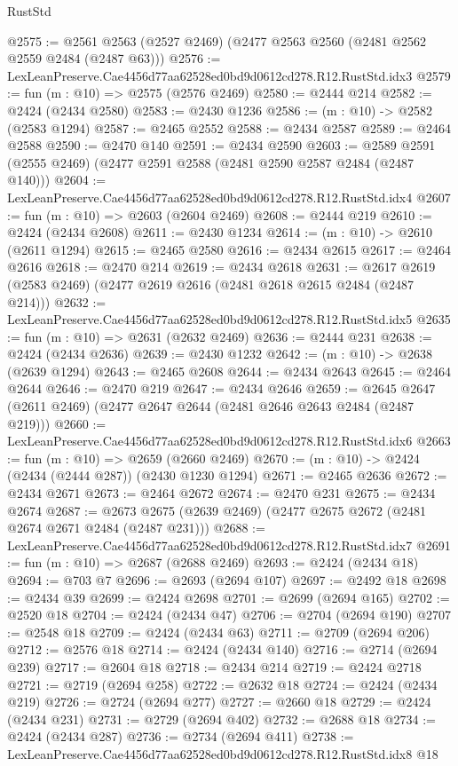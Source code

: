 \begin{lexlean}{RustStd}
\begin{coremodule}
@2575 := @2561 @2563 (@2527 @2469) (@2477 @2563 @2560 (@2481 @2562 @2559 @2484 (@2487 @63)))
@2576 := LexLeanPreserve.Cae4456d77aa62528ed0bd9d0612cd278.R12.RustStd.idx3
@2579 := fun (m : @10) => @2575 (@2576 @2469)
@2580 := @2444 @214
@2582 := @2424 (@2434 @2580)
@2583 := @2430 @1236
@2586 := (m : @10) -> @2582 (@2583 @1294)
@2587 := @2465 @2552
@2588 := @2434 @2587
@2589 := @2464 @2588
@2590 := @2470 @140
@2591 := @2434 @2590
@2603 := @2589 @2591 (@2555 @2469) (@2477 @2591 @2588 (@2481 @2590 @2587 @2484 (@2487 @140)))
@2604 := LexLeanPreserve.Cae4456d77aa62528ed0bd9d0612cd278.R12.RustStd.idx4
@2607 := fun (m : @10) => @2603 (@2604 @2469)
@2608 := @2444 @219
@2610 := @2424 (@2434 @2608)
@2611 := @2430 @1234
@2614 := (m : @10) -> @2610 (@2611 @1294)
@2615 := @2465 @2580
@2616 := @2434 @2615
@2617 := @2464 @2616
@2618 := @2470 @214
@2619 := @2434 @2618
@2631 := @2617 @2619 (@2583 @2469) (@2477 @2619 @2616 (@2481 @2618 @2615 @2484 (@2487 @214)))
@2632 := LexLeanPreserve.Cae4456d77aa62528ed0bd9d0612cd278.R12.RustStd.idx5
@2635 := fun (m : @10) => @2631 (@2632 @2469)
@2636 := @2444 @231
@2638 := @2424 (@2434 @2636)
@2639 := @2430 @1232
@2642 := (m : @10) -> @2638 (@2639 @1294)
@2643 := @2465 @2608
@2644 := @2434 @2643
@2645 := @2464 @2644
@2646 := @2470 @219
@2647 := @2434 @2646
@2659 := @2645 @2647 (@2611 @2469) (@2477 @2647 @2644 (@2481 @2646 @2643 @2484 (@2487 @219)))
@2660 := LexLeanPreserve.Cae4456d77aa62528ed0bd9d0612cd278.R12.RustStd.idx6
@2663 := fun (m : @10) => @2659 (@2660 @2469)
@2670 := (m : @10) -> @2424 (@2434 (@2444 @287)) (@2430 @1230 @1294)
@2671 := @2465 @2636
@2672 := @2434 @2671
@2673 := @2464 @2672
@2674 := @2470 @231
@2675 := @2434 @2674
@2687 := @2673 @2675 (@2639 @2469) (@2477 @2675 @2672 (@2481 @2674 @2671 @2484 (@2487 @231)))
@2688 := LexLeanPreserve.Cae4456d77aa62528ed0bd9d0612cd278.R12.RustStd.idx7
@2691 := fun (m : @10) => @2687 (@2688 @2469)
@2693 := @2424 (@2434 @18)
@2694 := @703 @7
@2696 := @2693 (@2694 @107)
@2697 := @2492 @18
@2698 := @2434 @39
@2699 := @2424 @2698
@2701 := @2699 (@2694 @165)
@2702 := @2520 @18
@2704 := @2424 (@2434 @47)
@2706 := @2704 (@2694 @190)
@2707 := @2548 @18
@2709 := @2424 (@2434 @63)
@2711 := @2709 (@2694 @206)
@2712 := @2576 @18
@2714 := @2424 (@2434 @140)
@2716 := @2714 (@2694 @239)
@2717 := @2604 @18
@2718 := @2434 @214
@2719 := @2424 @2718
@2721 := @2719 (@2694 @258)
@2722 := @2632 @18
@2724 := @2424 (@2434 @219)
@2726 := @2724 (@2694 @277)
@2727 := @2660 @18
@2729 := @2424 (@2434 @231)
@2731 := @2729 (@2694 @402)
@2732 := @2688 @18
@2734 := @2424 (@2434 @287)
@2736 := @2734 (@2694 @411)
@2738 := LexLeanPreserve.Cae4456d77aa62528ed0bd9d0612cd278.R12.RustStd.idx8 @18

\end{coremodule}
\end{lexlean}
